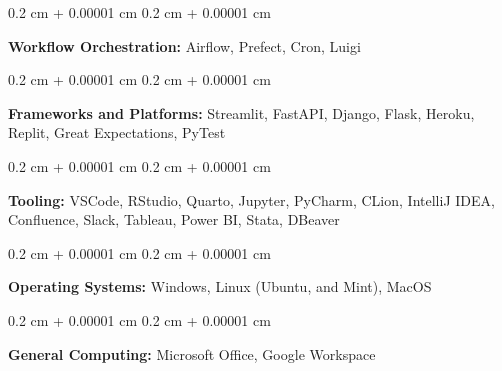 \documentclass[10pt, letterpaper]{article}
\newenvironment{onecolentry}{
    \begin{adjustwidth}{
        0.2 cm + 0.00001 cm
    }{
        0.2 cm + 0.00001 cm
    }
}{
    \end{adjustwidth}
} %
\begin{document}
        \vspace{0.2 cm}

        \begin{onecolentry}
            \textbf{Workflow Orchestration:} Airflow, Prefect, Cron, Luigi
        \end{onecolentry}

        \vspace{0.2 cm}

        \begin{onecolentry}
            \textbf{Frameworks and Platforms:} Streamlit, FastAPI, Django, Flask, Heroku, Replit, Great Expectations, PyTest
        \end{onecolentry}

        \vspace{0.2 cm}

        \begin{onecolentry}
            \textbf{Tooling:} VSCode, RStudio, Quarto, Jupyter, PyCharm, CLion, IntelliJ IDEA, Confluence, Slack, Tableau, Power BI, Stata, DBeaver
        \end{onecolentry}

        \vspace{0.2 cm}

        \begin{onecolentry}
            \textbf{Operating Systems:} Windows, Linux (Ubuntu, and Mint), MacOS
        \end{onecolentry}

        \vspace{0.2 cm}

        \begin{onecolentry}
            \textbf{General Computing:} Microsoft Office, Google Workspace
        \end{onecolentry}


    
\end{document}
